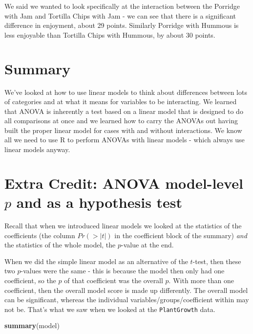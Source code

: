\documentclass[
]{book}
\newenvironment{Shaded}{\begin{snugshade}}{\end{snugshade}}
\newcommand{\KeywordTok}[1]{\textcolor[rgb]{0.13,0.29,0.53}{\textbf{#1}}}
\newcommand{\NormalTok}[1]{#1}
\begin{document}
We said we wanted to look specifically at the interaction between the Porridge with Jam and Tortilla Chips with Jam - we can see that there is a significant difference in enjoyment, about 29 points. Similarly Porridge with Hummous is less enjoyable than Tortilla Chips with Hummous, by about 30 points.

\hypertarget{summary}{%
\section{Summary}\label{summary}}

We've looked at how to use linear models to think about differences between lots of categories and at what it means for variables to be interacting. We learned that ANOVA is inherently a test based on a linear model that is designed to do all comparisons at once and we learned how to carry the ANOVAs out having built the proper linear model for cases with and without interactions. We know all we need to use R to perform ANOVAs with linear models - which always use linear models anyway.

\hypertarget{extra-credit-anova-model-level-p-and-as-a-hypothesis-test}{%
\section{\texorpdfstring{Extra Credit: ANOVA model-level \(p\) and as a hypothesis test}{Extra Credit: ANOVA model-level p and as a hypothesis test}}\label{extra-credit-anova-model-level-p-and-as-a-hypothesis-test}}

Recall that when we introduced linear models we looked at the statistics of the coefficients (the column \(Pr(>|t|)\) in the coefficient block of the summary) \emph{and} the statistics of the whole model, the \(p\)-value at the end.

When we did the simple linear model as an alternative of the \(t\)-test, then these two \(p\)-values were the same - this is because the model then only had one coefficient, so the \(p\) of that coefficient was the overall \(p\). With more than one coefficient, then the overall model score is made up differently. The overall model can be significant, whereas the individual variables/groups/coefficient within may not be. That's what we saw when we looked at the \texttt{PlantGrowth} data.

\begin{Shaded}
\begin{Highlighting}[]
\KeywordTok{summary}\NormalTok{(model)}
\end{Highlighting}
\end{Shaded}
\end{document}
